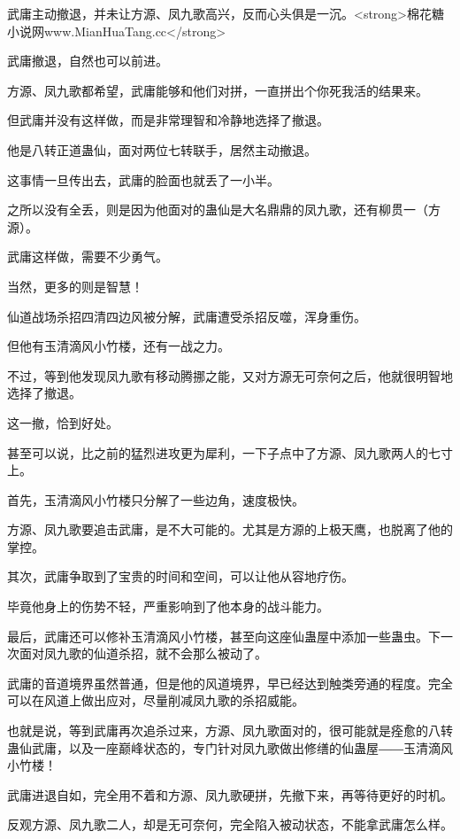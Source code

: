 
\begin{this_body}

武庸主动撤退，并未让方源、凤九歌高兴，反而心头俱是一沉。<strong>棉花糖小说网www.MianHuaTang.cc</strong>

武庸撤退，自然也可以前进。

方源、凤九歌都希望，武庸能够和他们对拼，一直拼出个你死我活的结果来。

但武庸并没有这样做，而是非常理智和冷静地选择了撤退。

他是八转正道蛊仙，面对两位七转联手，居然主动撤退。

这事情一旦传出去，武庸的脸面也就丢了一小半。

之所以没有全丢，则是因为他面对的蛊仙是大名鼎鼎的凤九歌，还有柳贯一（方源）。

武庸这样做，需要不少勇气。

当然，更多的则是智慧！

仙道战场杀招四清四边风被分解，武庸遭受杀招反噬，浑身重伤。

但他有玉清滴风小竹楼，还有一战之力。

不过，等到他发现凤九歌有移动腾挪之能，又对方源无可奈何之后，他就很明智地选择了撤退。

这一撤，恰到好处。

甚至可以说，比之前的猛烈进攻更为犀利，一下子点中了方源、凤九歌两人的七寸上。

首先，玉清滴风小竹楼只分解了一些边角，速度极快。

方源、凤九歌要追击武庸，是不大可能的。尤其是方源的上极天鹰，也脱离了他的掌控。

其次，武庸争取到了宝贵的时间和空间，可以让他从容地疗伤。

毕竟他身上的伤势不轻，严重影响到了他本身的战斗能力。

最后，武庸还可以修补玉清滴风小竹楼，甚至向这座仙蛊屋中添加一些蛊虫。下一次面对凤九歌的仙道杀招，就不会那么被动了。

武庸的音道境界虽然普通，但是他的风道境界，早已经达到触类旁通的程度。完全可以在风道上做出应对，尽量削减凤九歌的杀招威能。

也就是说，等到武庸再次追杀过来，方源、凤九歌面对的，很可能就是痊愈的八转蛊仙武庸，以及一座巅峰状态的，专门针对凤九歌做出修缮的仙蛊屋――玉清滴风小竹楼！

武庸进退自如，完全用不着和方源、凤九歌硬拼，先撤下来，再等待更好的时机。

反观方源、凤九歌二人，却是无可奈何，完全陷入被动状态，不能拿武庸怎么样。


\end{this_body}
